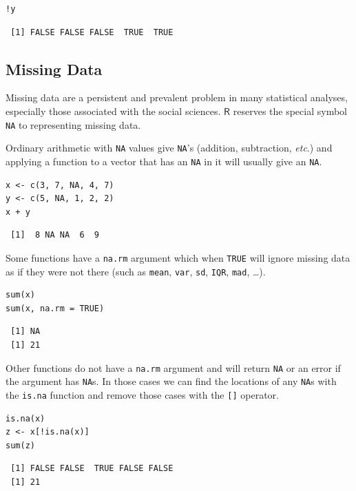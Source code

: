 \documentclass[captions=tableheading]{scrbook}
\begin{document}
\begin{verbatim}
!y
\end{verbatim}

\begin{verbatim}
 [1] FALSE FALSE FALSE  TRUE  TRUE
\end{verbatim}
\subsection{Missing Data}
\label{sec-2-1-6}
\label{sub:Missing-Data}


Missing data are a persistent and prevalent problem in many statistical analyses, especially those associated with the social sciences. \(\mathsf{R}\) reserves the special symbol \texttt{NA} to representing missing data.

Ordinary arithmetic with \texttt{NA} values give \texttt{NA}'s (addition, subtraction, \emph{etc}.) and applying a function to a vector that has an \texttt{NA} in it will usually give an \texttt{NA}.


\begin{verbatim}
x <- c(3, 7, NA, 4, 7)
y <- c(5, NA, 1, 2, 2)
x + y
\end{verbatim}

\begin{verbatim}
 [1]  8 NA NA  6  9
\end{verbatim}

Some functions have a \texttt{na.rm} argument which when \texttt{TRUE} will ignore missing data as if they were not there (such as \texttt{mean}, \texttt{var}, \texttt{sd}, \texttt{IQR}, \texttt{mad}, \ldots{}). 


\begin{verbatim}
sum(x)
sum(x, na.rm = TRUE)
\end{verbatim}

\begin{verbatim}
 [1] NA
 [1] 21
\end{verbatim}

Other functions do not have a \texttt{na.rm} argument and will return \texttt{NA} or an error if the argument has \texttt{NA}s. In those cases we can find the locations of any \texttt{NA}s with the \texttt{is.na} function and remove those cases with the \texttt{[]} operator.


\begin{verbatim}
is.na(x)
z <- x[!is.na(x)]
sum(z)
\end{verbatim}

\begin{verbatim}
 [1] FALSE FALSE  TRUE FALSE FALSE
 [1] 21
\end{verbatim}
\end{document}
